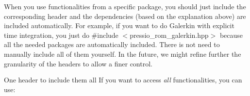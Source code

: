 \begin{DoxyParagraph}{}
When you use functionalities from a specific package, you should just include the corresponding header and the dependencies (based on the explanation above) are included automatically. For example, if you want to do Galerkin with explicit time integration, you just do {\ttfamily \#include $<$pressio\+\_\+rom\+\_\+galerkin.\+hpp$>$} because all the needed packages are automatically included. There is not need to manually include all of them yourself. In the future, we might refine further the granularity of the headers to allow a finer control.
\end{DoxyParagraph}


\begin{DoxyParagraph}{One header to include them all}
If you want to access {\itshape all} functionalities, you can use\+: 
\begin{DoxyCode}{0}
\end{DoxyCode}
 
\end{DoxyParagraph}
